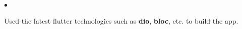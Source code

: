 \documentclass[10pt,a4paper]{extarticle}
\newcommand{\myProjectItem}[2]{
	\item {
	            \color{resumeBlueDark}
	            \textbf{#1}}\\#2
}
\begin{document}
\begin{minipage}{0.55\textwidth}
\begin{list}{{\color{resumeBlueLight}}}{\leftmargin 1mm}
{\begin{list}{\color{resumeBlueLight}$\bullet$}{\leftmargin 3mm}
				\vspace{-1mm}
				\item{Used the latest flutter technologies such as \textbf{dio}, \textbf{bloc}, etc. to build the app.}
			\end{list}
			\vspace{-2mm}
        }



\end{list}
\end{minipage}
\end{document}
